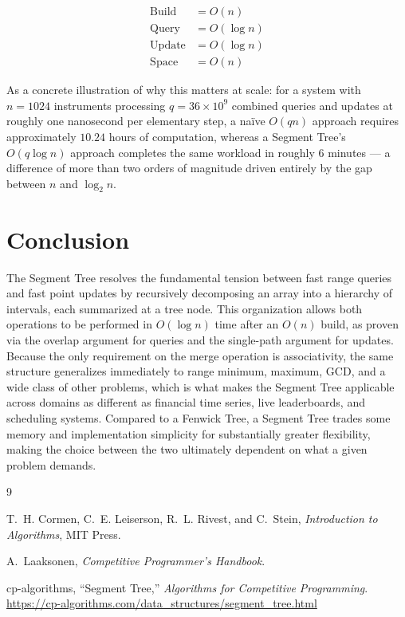 \documentclass[11pt]{article}
\begin{document}
\begin{equation}
\boxed{
\begin{aligned}
\text{Build} &= O(n) \\
\text{Query} &= O(\log n) \\
\text{Update} &= O(\log n) \\
\text{Space} &= O(n)
\end{aligned}}
\end{equation}

As a concrete illustration of why this matters at scale: for a system with $n = 1024$ instruments processing $q = 36 \times 10^9$ combined queries and updates at roughly one nanosecond per elementary step, a na\"ive $O(qn)$ approach requires approximately $10.24$ hours of computation, whereas a Segment Tree's $O(q \log n)$ approach completes the same workload in roughly $6$ minutes --- a difference of more than two orders of magnitude driven entirely by the gap between $n$ and $\log_2 n$.

\section{Conclusion}

The Segment Tree resolves the fundamental tension between fast range queries and fast point updates by recursively decomposing an array into a hierarchy of intervals, each summarized at a tree node. This organization allows both operations to be performed in $O(\log n)$ time after an $O(n)$ build, as proven via the overlap argument for queries and the single-path argument for updates. Because the only requirement on the merge operation is associativity, the same structure generalizes immediately to range minimum, maximum, GCD, and a wide class of other problems, which is what makes the Segment Tree applicable across domains as different as financial time series, live leaderboards, and scheduling systems. Compared to a Fenwick Tree, a Segment Tree trades some memory and implementation simplicity for substantially greater flexibility, making the choice between the two ultimately dependent on what a given problem demands.

\begin{thebibliography}{9}

T.~H. Cormen, C.~E. Leiserson, R.~L. Rivest, and C.~Stein, \textit{Introduction to Algorithms}, MIT Press.

A.~Laaksonen, \textit{Competitive Programmer's Handbook}.

cp-algorithms, ``Segment Tree,'' \textit{Algorithms for Competitive Programming}. \url{https://cp-algorithms.com/data_structures/segment_tree.html}

\end{thebibliography}
\end{document}
